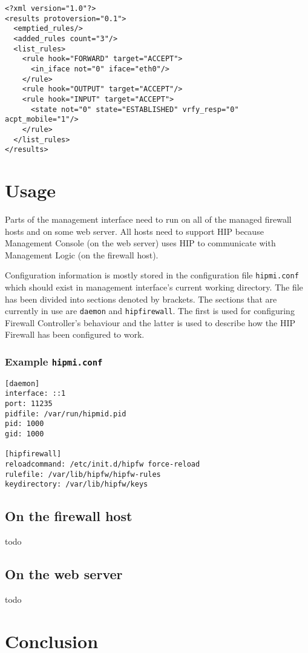 \documentclass[a4paper,titlepage]{article}
\begin{document}
\begin{verbatim}
<?xml version="1.0"?>
<results protoversion="0.1">
  <emptied_rules/>
  <added_rules count="3"/>
  <list_rules>
    <rule hook="FORWARD" target="ACCEPT">
      <in_iface not="0" iface="eth0"/>
    </rule>
    <rule hook="OUTPUT" target="ACCEPT"/>
    <rule hook="INPUT" target="ACCEPT">
      <state not="0" state="ESTABLISHED" vrfy_resp="0" acpt_mobile="1"/>
    </rule>
  </list_rules>
</results>
\end{verbatim}

\section{Usage}

Parts of the management interface need to run on all of the managed
firewall hosts and on some web server. All hosts need to support HIP
because Management Console (on the web server) uses HIP to communicate
with Management Logic (on the firewall host).

Configuration information is mostly stored in the configuration file
\texttt{hipmi.conf} which should exist in management interface's
current working directory. The file has been divided into sections
denoted by brackets. The sections that are currently in use are
\texttt{daemon} and \texttt{hipfirewall}. The first is used for configuring
Firewall Controller's behaviour and the latter is used to describe how
the HIP Firewall has been configured to work.

\subsubsection*{Example \texttt{hipmi.conf}}

\begin{verbatim}
[daemon]
interface: ::1
port: 11235
pidfile: /var/run/hipmid.pid
pid: 1000
gid: 1000

[hipfirewall]
reloadcommand: /etc/init.d/hipfw force-reload
rulefile: /var/lib/hipfw/hipfw-rules
keydirectory: /var/lib/hipfw/keys
\end{verbatim}

\subsection{On the firewall host}

todo

\subsection{On the web server}

todo

\section{Conclusion}





\appendix
\newpage
\end{document}
